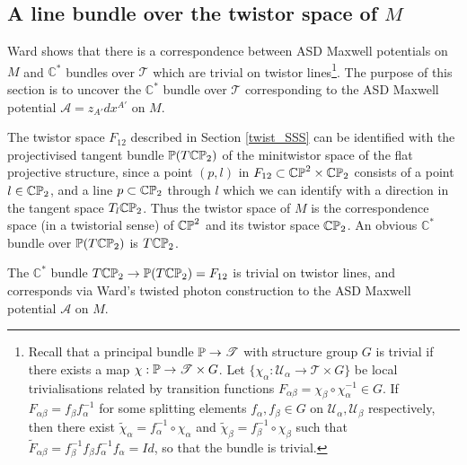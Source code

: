 \subsection{A line bundle over the twistor space of $M$}
Ward \cite{wardtf} shows that there is a correspondence between ASD Maxwell potentials on $M$ and $\mathbb{C}^*$ bundles over $\mathscr{T}$ which are trivial on twistor lines\footnote{Recall that a principal bundle $\mathbb{P}\rightarrow\mathscr{T}$ with structure group $G$ is trivial if there exists a map $\chi:\mathbb{P}\rightarrow\mathscr{T}\times G$. Let $\{\chi_\alpha:\mathcal{U}_\alpha\rightarrow\mathscr{T}\times G\}$ be local trivialisations related by transition functions $F_{\alpha\beta}=\chi_\beta\circ\chi^{-1}_\alpha\in G$. If $F_{\alpha\beta}=f_\beta f_\alpha^{-1}$ for some splitting elements $f_\alpha,f_\beta\in G$ on $\mathcal{U}_\alpha,\mathcal{U}_\beta$ respectively, then there exist $\tilde{\chi}_\alpha=f_\alpha^{-1}\circ\chi_\alpha$ and $\tilde{\chi}_\beta=f_\beta^{-1}\circ\chi_\beta$ such that $\tilde{F}_{\alpha\beta}=f_\beta^{-1}f_\beta f_\alpha^{-1}f_\alpha=Id$, so that the bundle is trivial.}. The purpose of this section is to uncover the $\mathbb{C}^*$ bundle over $\mathscr{T}$ corresponding to the ASD Maxwell potential $\mathcal{A}=z_{A'}dx^{A'}$ on $M$.

The twistor space $F_{12}$ described in Section \ref{twist_SSS} can be identified with the projectivised tangent bundle ${\mathbb{P}(T\mathbb{CP}_2)}$ of the minitwistor space of the flat projective structure, since a point $(p,l)$ in $F_{12}\subset\mathbb{CP}^2\times\mathbb{CP}_2$ consists of a point $l\in\mathbb{CP}_2$, and a line $p\subset\mathbb{CP}_2$ through $l$ which we can identify with a direction in the tangent space $T_l\mathbb{CP}_2$. Thus the twistor space of $M$ is the correspondence space (in a twistorial sense) of $\mathbb{CP}^2$ and its twistor space $\mathbb{CP}_2$. An obvious $\mathbb{C}^*$ bundle over ${\mathbb{P}(T\mathbb{CP}_2)}$ is $T\mathbb{CP}_2$.

\begin{prop}
The $\mathbb{C}^*$ bundle $T\mathbb{CP}_2\rightarrow\mathbb{P}(T\mathbb{CP}_2)=F_{12}$ is trivial on twistor lines, and corresponds via Ward's twisted photon construction to the ASD Maxwell potential $\mathcal{A}$ on $M$.
\end{prop}
 
